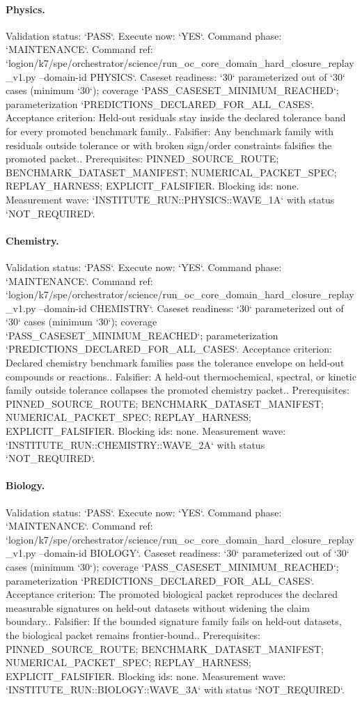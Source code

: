 \paragraph{Physics.}
Validation status: `PASS`. Execute now: `YES`. Command phase: `MAINTENANCE`.
Command ref: `logion/k7/spe/orchestrator/science/run\_oc\_core\_domain\_hard\_closure\_replay\_v1.py --domain-id PHYSICS`.
Caseset readiness: `30` parameterized out of `30` cases (minimum `30`); coverage `PASS\_CASESET\_MINIMUM\_REACHED`; parameterization `PREDICTIONS\_DECLARED\_FOR\_ALL\_CASES`.
Acceptance criterion: Held-out residuals stay inside the declared tolerance band for every promoted benchmark family..
Falsifier: Any benchmark family with residuals outside tolerance or with broken sign/order constraints falsifies the promoted packet..
Prerequisites: PINNED\_SOURCE\_ROUTE; BENCHMARK\_DATASET\_MANIFEST; NUMERICAL\_PACKET\_SPEC; REPLAY\_HARNESS; EXPLICIT\_FALSIFIER.
Blocking ids: none.
Measurement wave: `INSTITUTE\_RUN::PHYSICS::WAVE\_1A` with status `NOT\_REQUIRED`.

\paragraph{Chemistry.}
Validation status: `PASS`. Execute now: `YES`. Command phase: `MAINTENANCE`.
Command ref: `logion/k7/spe/orchestrator/science/run\_oc\_core\_domain\_hard\_closure\_replay\_v1.py --domain-id CHEMISTRY`.
Caseset readiness: `30` parameterized out of `30` cases (minimum `30`); coverage `PASS\_CASESET\_MINIMUM\_REACHED`; parameterization `PREDICTIONS\_DECLARED\_FOR\_ALL\_CASES`.
Acceptance criterion: Declared chemistry benchmark families pass the tolerance envelope on held-out compounds or reactions..
Falsifier: A held-out thermochemical, spectral, or kinetic family outside tolerance collapses the promoted chemistry packet..
Prerequisites: PINNED\_SOURCE\_ROUTE; BENCHMARK\_DATASET\_MANIFEST; NUMERICAL\_PACKET\_SPEC; REPLAY\_HARNESS; EXPLICIT\_FALSIFIER.
Blocking ids: none.
Measurement wave: `INSTITUTE\_RUN::CHEMISTRY::WAVE\_2A` with status `NOT\_REQUIRED`.

\paragraph{Biology.}
Validation status: `PASS`. Execute now: `YES`. Command phase: `MAINTENANCE`.
Command ref: `logion/k7/spe/orchestrator/science/run\_oc\_core\_domain\_hard\_closure\_replay\_v1.py --domain-id BIOLOGY`.
Caseset readiness: `30` parameterized out of `30` cases (minimum `30`); coverage `PASS\_CASESET\_MINIMUM\_REACHED`; parameterization `PREDICTIONS\_DECLARED\_FOR\_ALL\_CASES`.
Acceptance criterion: The promoted biological packet reproduces the declared measurable signatures on held-out datasets without widening the claim boundary..
Falsifier: If the bounded signature family fails on held-out datasets, the biological packet remains frontier-bound..
Prerequisites: PINNED\_SOURCE\_ROUTE; BENCHMARK\_DATASET\_MANIFEST; NUMERICAL\_PACKET\_SPEC; REPLAY\_HARNESS; EXPLICIT\_FALSIFIER.
Blocking ids: none.
Measurement wave: `INSTITUTE\_RUN::BIOLOGY::WAVE\_3A` with status `NOT\_REQUIRED`.

